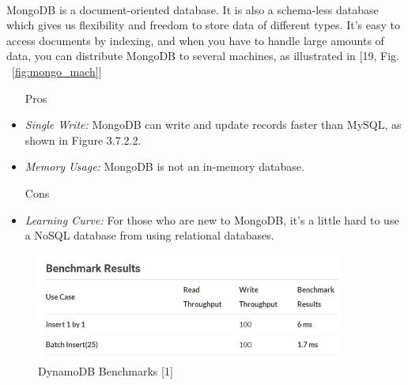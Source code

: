 \documentclass[12pt,journal,compsoc]{IEEEtran}
\newenvironment{subs}
  {\adjustwidth{1em}{0pt}}
  {\endadjustwidth}
\begin{document}
\begin{subs}
\begin{subs}
\begin{subs}
\\
MongoDB is a document-oriented database. It is also a schema-less database which gives us flexibility and freedom to store data of different types. It’s easy to access documents by indexing, and when you have to handle large amounts of data, you can distribute MongoDB to several machines, as illustrated in [19, Fig. ~\ref{fig:mongo_mach}]

\begin{subs}
\begin{itemize}
    \item [{Pros}]
    \item \emph{Single Write:} MongoDB can write and update records faster than MySQL, as shown in Figure 3.7.2.2.
    \item \emph{Memory Usage:} MongoDB is not an in-memory database.
    \item [{Cons}]
    \item \emph{Learning Curve:} For those who are new to MongoDB, it's a little hard to use a NoSQL database from using relational databases.
\end{itemize}
\end{subs}


\begin{figure}[H]
\centering
\includegraphics[width=4in]{images/dynamo_bench.JPG}
\caption{DynamoDB Benchmarks [1]}
\label{fig:dynamo_bench}
\end{figure}


\end{subs}
\end{subs}
\end{subs}
\end{document}
